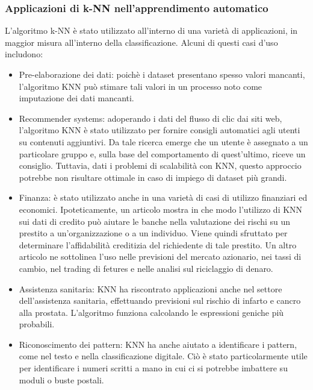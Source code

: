 \subsubsection{Applicazioni di k-NN nell'apprendimento automatico}
L'algoritmo k-NN è stato utilizzato all'interno di una varietà di applicazioni, in maggior misura all'interno della classificazione. Alcuni di questi casi d'uso includono:
\begin{itemize}
\item Pre-elaborazione dei dati: poichè i dataset presentano spesso valori mancanti, l'algoritmo KNN può stimare tali valori in un processo noto come imputazione dei dati mancanti.
\item Recommender systems: adoperando i dati del flusso di clic dai siti web, l'algoritmo KNN è stato utilizzato per fornire consigli automatici agli utenti su contenuti aggiuntivi. Da tale ricerca emerge che un utente è assegnato a un particolare gruppo e, sulla base del comportamento di quest'ultimo, riceve un consiglio. Tuttavia, dati i problemi di scalabilità con KNN, questo approccio potrebbe non risultare ottimale in caso di impiego di dataset più grandi.
\item Finanza: è stato utilizzato anche in una varietà di casi di utilizzo finanziari ed economici. Ipoteticamente, un articolo mostra in che modo l'utilizzo di KNN sui dati di credito può aiutare le banche nella valutazione dei rischi su un prestito a un'organizzazione o a un individuo. Viene quindi sfruttato per determinare l'affidabilità creditizia del richiedente di tale prestito. Un altro articolo ne sottolinea l'uso nelle previsioni del mercato azionario, nei tassi di cambio, nel trading di fetures e nelle analisi sul riciclaggio di denaro.
\item Assistenza sanitaria: KNN ha riscontrato applicazioni anche nel settore dell'assistenza sanitaria, effettuando previsioni sul rischio di infarto e cancro alla prostata. L'algoritmo funziona calcolando le espressioni geniche più probabili.
\item Riconoscimento dei pattern: KNN ha anche aiutato a identificare i pattern, come nel testo e nella classificazione digitale. Ciò è stato particolarmente utile per identificare i numeri scritti a mano in cui ci si potrebbe imbattere su moduli o buste postali.
\end{itemize}

